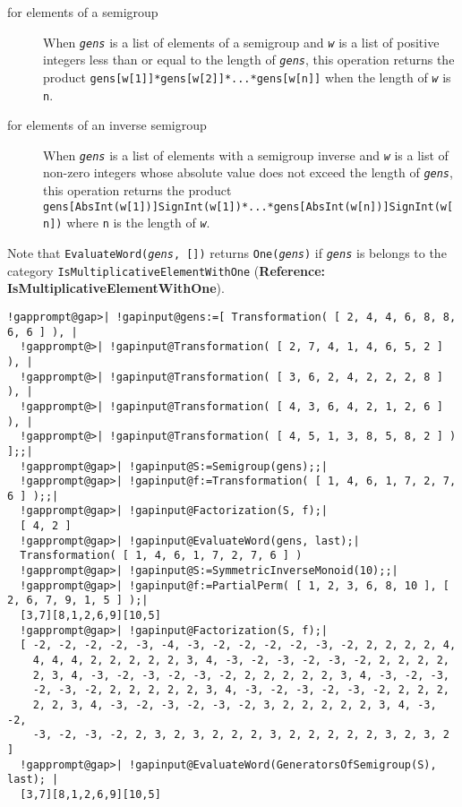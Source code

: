 \documentclass[a4paper,11pt]{report}
\begin{document}
{{{ 
\begin{description}
\item[{for elements of a semigroup}]  When \mbox{\texttt{\mdseries\slshape gens}} is a list of elements of a semigroup and \mbox{\texttt{\mdseries\slshape w}} is a list of positive integers less than or equal to the length of \mbox{\texttt{\mdseries\slshape gens}}, this operation returns the product \texttt{gens[w[1]]*gens[w[2]]*...*gens[w[n]]} when the length of \mbox{\texttt{\mdseries\slshape w}} is \texttt{n}. 
\item[{for elements of an inverse semigroup}]  When \mbox{\texttt{\mdseries\slshape gens}} is a list of elements with a semigroup inverse and \mbox{\texttt{\mdseries\slshape w}} is a list of non-zero integers whose absolute value does not exceed the length
of \mbox{\texttt{\mdseries\slshape gens}}, this operation returns the product \texttt{gens[AbsInt(w[1])]\texttt{}SignInt(w[1])*...*gens[AbsInt(w[n])]\texttt{}SignInt(w[n])} where \texttt{n} is the length of \mbox{\texttt{\mdseries\slshape w}}. 
\end{description}
 Note that \texttt{EvaluateWord(\mbox{\texttt{\mdseries\slshape gens}}, [])} returns \texttt{One(\mbox{\texttt{\mdseries\slshape gens}})} if \mbox{\texttt{\mdseries\slshape gens}} is belongs to the category \texttt{IsMultiplicativeElementWithOne} (\textbf{Reference: IsMultiplicativeElementWithOne}). 
\begin{Verbatim}[commandchars=!@|,fontsize=\small,frame=single,label=Example]
  !gapprompt@gap>| !gapinput@gens:=[ Transformation( [ 2, 4, 4, 6, 8, 8, 6, 6 ] ), |
  !gapprompt@>| !gapinput@Transformation( [ 2, 7, 4, 1, 4, 6, 5, 2 ] ), |
  !gapprompt@>| !gapinput@Transformation( [ 3, 6, 2, 4, 2, 2, 2, 8 ] ), |
  !gapprompt@>| !gapinput@Transformation( [ 4, 3, 6, 4, 2, 1, 2, 6 ] ), |
  !gapprompt@>| !gapinput@Transformation( [ 4, 5, 1, 3, 8, 5, 8, 2 ] ) ];;|
  !gapprompt@gap>| !gapinput@S:=Semigroup(gens);;|
  !gapprompt@gap>| !gapinput@f:=Transformation( [ 1, 4, 6, 1, 7, 2, 7, 6 ] );;|
  !gapprompt@gap>| !gapinput@Factorization(S, f);|
  [ 4, 2 ]
  !gapprompt@gap>| !gapinput@EvaluateWord(gens, last);|
  Transformation( [ 1, 4, 6, 1, 7, 2, 7, 6 ] )
  !gapprompt@gap>| !gapinput@S:=SymmetricInverseMonoid(10);;|
  !gapprompt@gap>| !gapinput@f:=PartialPerm( [ 1, 2, 3, 6, 8, 10 ], [ 2, 6, 7, 9, 1, 5 ] );|
  [3,7][8,1,2,6,9][10,5]
  !gapprompt@gap>| !gapinput@Factorization(S, f);|
  [ -2, -2, -2, -2, -3, -4, -3, -2, -2, -2, -2, -3, -2, 2, 2, 2, 2, 4, 
    4, 4, 4, 2, 2, 2, 2, 2, 3, 4, -3, -2, -3, -2, -3, -2, 2, 2, 2, 2, 
    2, 3, 4, -3, -2, -3, -2, -3, -2, 2, 2, 2, 2, 2, 3, 4, -3, -2, -3, 
    -2, -3, -2, 2, 2, 2, 2, 2, 3, 4, -3, -2, -3, -2, -3, -2, 2, 2, 2, 
    2, 2, 3, 4, -3, -2, -3, -2, -3, -2, 3, 2, 2, 2, 2, 2, 3, 4, -3, -2, 
    -3, -2, -3, -2, 2, 3, 2, 3, 2, 2, 2, 3, 2, 2, 2, 2, 2, 3, 2, 3, 2 ]
  !gapprompt@gap>| !gapinput@EvaluateWord(GeneratorsOfSemigroup(S), last); |
  [3,7][8,1,2,6,9][10,5]
\end{Verbatim}
 }

}}
\end{document}
